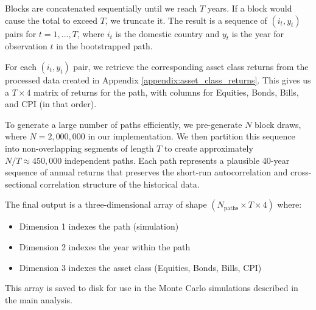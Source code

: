 \documentclass[11pt]{article}
\begin{document}
Blocks are concatenated sequentially until we reach $T$ years. If a block would cause the total to exceed $T$, we truncate it. The result is a sequence of $(i_t, y_t)$ pairs for $t = 1, \ldots, T$, where $i_t$ is the domestic country and $y_t$ is the year for observation $t$ in the bootstrapped path.

For each $(i_t, y_t)$ pair, we retrieve the corresponding asset class returns from the processed data created in Appendix \ref{appendix:asset_class_returns}. This gives us a $T \times 4$ matrix of returns for the path, with columns for Equities, Bonds, Bills, and CPI (in that order).

To generate a large number of paths efficiently, we pre-generate $N$ block draws, where $N = 2{,}000{,}000$ in our implementation. We then partition this sequence into non-overlapping segments of length $T$ to create approximately $N/T \approx 450{,}000$ independent paths. Each path represents a plausible 40-year sequence of annual returns that preserves the short-run autocorrelation and cross-sectional correlation structure of the historical data.

The final output is a three-dimensional array of shape $(N_{\text{paths}} \times T \times 4)$ where:
\begin{itemize}
    \item Dimension 1 indexes the path (simulation)
    \item Dimension 2 indexes the year within the path
    \item Dimension 3 indexes the asset class (Equities, Bonds, Bills, CPI)
\end{itemize}

This array is saved to disk for use in the Monte Carlo simulations described in the main analysis.
\end{document}
